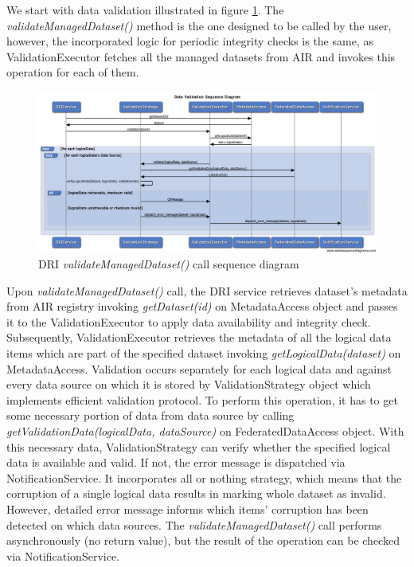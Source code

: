 We start with data validation illustrated in figure
\ref{fig:validation-diagram}. The \textit{validateManagedDataset()} method is the one
designed to be called by the user, however, the incorporated logic for periodic
integrity checks is the same, as ValidationExecutor fetches all the managed
datasets from AIR and invokes this operation for each of them.\\

\begin{figure}[h!]
	\centering
	\includegraphics[width=\textwidth]{images/validation-diagram.png}
	\caption{DRI \textit{validateManagedDataset()} call sequence diagram}
	\label{fig:validation-diagram}
\end{figure}

Upon \textit{validateManagedDataset()} call, the DRI service retrieves dataset's
metadata from AIR registry invoking \textit{getDataset(id)} on MetadataAccess object
and passes it to the ValidationExecutor to apply data availability and
integrity check. Subsequently, ValidationExecutor retrieves the metadata of
all the logical data items which are part of the specified dataset invoking
\textit{getLogicalData(dataset)} on MetadataAccess. Validation occurs separately for
each logical data and against every data source on which it is stored by
ValidationStrategy object which implements efficient validation protocol. To
perform this operation, it has to get some necessary portion of data from data
source by calling \textit{getValidationData(logicalData, dataSource)} on
FederatedDataAccess object. With this necessary data, ValidationStrategy can
verify whether the specified logical data is available and valid. If not, the
error message is dispatched via NotificationService. It incorporates all or
nothing strategy, which means that the corruption of a single logical data
results in marking whole dataset as invalid. However, detailed error message
informs which items' corruption has been detected on which data sources. The
\textit{validateManagedDataset()} call performs asynchronously (no return value), but
the result of the operation can be checked via NotificationService.\\

